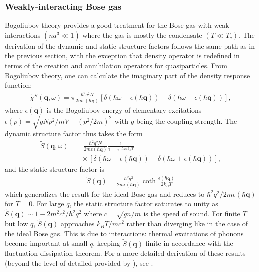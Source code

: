 \documentclass[prl,
twocolumn,
nofootinbib,
amsmath,amssymb,
aps]{revtex4-1}
\newcommand{\f}[2]{\frac{#1}{#2}}
\begin{document}
\subsubsection{Weakly-interacting Bose gas}
Bogoliubov theory provides a good treatment for the Bose gas with weak interactions $(na^3\ll1)$ where the gas is mostly the condensate $(T\ll T_c)$. The derivation of the dynamic and static structure factors follows the same path as in the previous section, with the exception that density operator is redefined in terms of the creation and annihilation operators for quasiparticles. From Bogoliubov theory, one can calculate the imaginary part of the density response function:
\begin{align*}
\widetilde{\chi}''(\mathbf{q},\omega) = \pi \f{\hbar^2 q^2 N}{2m \epsilon(\mathbf{\hbar q})} 
[\delta(\hbar \omega - \epsilon(\mathbf{\hbar q})) - \delta(\hbar \omega + \epsilon(\mathbf{\hbar q}))],
\end{align*}
where $\epsilon(\mathbf{q})$ is the Bogoliubov energy of elementary excitations $\epsilon(p) = \sqrt{gNp^2/mV + (p^2/2m)^2}$ with $g$ being the coupling strength. The dynamic structure factor thus takes the form
\begin{align*}
\widetilde{S}(\mathbf{q},\omega) 
&= \f{\hbar^2 q^2 N}{2m\epsilon(\mathbf{\hbar q})} \f{1}{1-e^{-\hbar \omega/k_BT}} \\
&\quad\times[\delta(\hbar \omega - \epsilon(\mathbf{\hbar q})) - \delta(\hbar \omega + \epsilon(\mathbf{\hbar q}))],
\end{align*}
and the static structure factor is 
\begin{align*}
\widetilde{S}(\mathbf{q}) = \f{\hbar^2 q^2}{2m\epsilon(\mathbf{\hbar q})} \coth \f{\epsilon(\hbar\mathbf{q})}{2k_BT}
\end{align*}
which generalizes the result for the ideal Bose gas and reduces to $\hbar^2 q^2/2m\epsilon(\hbar \mathbf{q})$ for $T = 0$. For large $q$, the static structure factor saturates to unity as $\widetilde{S}(\mathbf{q}) \sim 1 - 2m^2c^2 / \hbar^2 q^2$ where $c = \sqrt{gn/m}$ is the speed of sound. For finite $T$ but low $q$, $\widetilde{S}(\mathbf{q})$ approaches $k_BT / mc^2$ rather than diverging like in the case of the ideal Bose gas. This is due to interactions: thermal excitations of phonons become important at small $q$, keeping $\widetilde{S}(\mathbf{q})$ finite in accordance with the fluctuation-dissipation theorem. For a more detailed derivation of these results (beyond the level of detailed provided by \cite{pitaevskii2016bose}), see \cite{yukalov2007structure}. 
\end{document}
